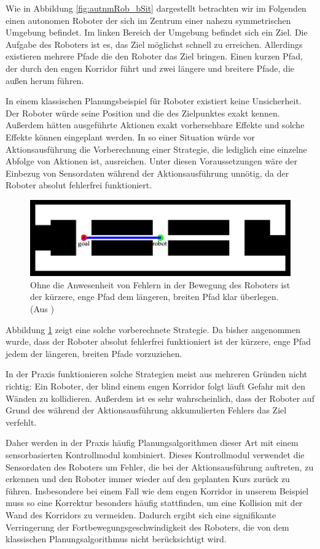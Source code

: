 \documentclass[a4paper]{IEEEtran}
\begin{document}
Wie in Abbildung \ref{fig:autnmRob_bSit} dargestellt betrachten wir im Folgenden einen autonomen Roboter der sich im Zentrum einer nahezu symmetrischen Umgebung befindet. Im linken Bereich der Umgebung befindet sich ein Ziel. Die Aufgabe des Roboters ist es, das Ziel möglichst schnell zu erreichen. Allerdings existieren mehrere Pfade die den Roboter das Ziel bringen. Einen kurzen Pfad, der durch den engen Korridor führt und zwei längere und breitere Pfade, die außen herum führen.

In einem klassischen Planungsbeispiel für Roboter existiert keine Unsicherheit. Der Roboter würde seine Position und die des Zielpunktes exakt kennen. Außerdem hätten ausgeführte Aktionen exakt vorhersehbare Effekte und solche Effekte können eingeplant werden. In so einer Situation würde vor Aktionsausführung die Vorberechnung einer Strategie, die lediglich eine einzelne Abfolge von Aktionen ist, ausreichen. Unter diesen Voraussetzungen wäre der Einbezug von Sensordaten während der Aktionsausführung unnötig, da der Roboter absolut fehlerfrei funktioniert.

\begin{figure}[ht]
	\centering
	\includegraphics[scale=0.72]{images/autnmRobot_directPath.png}
	\caption{Ohne die Anwesenheit von Fehlern in der Bewegung des Roboters ist der kürzere, enge Pfad dem längeren, breiten Pfad klar überlegen. (Aus \cite{thrun2005probabilistic})}
	\label{fig:autnmRob_dirPath}
\end{figure}

Abbildung \ref{fig:autnmRob_dirPath} zeigt eine solche vorberechnete Strategie. Da bisher angenommen wurde, dass der Roboter absolut fehlerfrei funktioniert ist der kürzere, enge Pfad jedem der längeren, breiten Pfade vorzuziehen.

In der Praxis funktionieren solche Strategien meist aus mehreren Gründen nicht richtig: Ein Roboter, der blind einem engen Korridor folgt läuft Gefahr mit den Wänden zu kollidieren. Außerdem ist es sehr wahrscheinlich, dass der Roboter auf Grund des während der Aktionsausführung akkumulierten Fehlers das Ziel verfehlt.

Daher werden in der Praxis häufig Planungsalgorithmen dieser Art mit einem sensorbasierten Kontrollmodul kombiniert. Dieses Kontrollmodul verwendet die Sensordaten des Roboters um Fehler, die bei der Aktionsausführung auftreten, zu erkennen und den Roboter immer wieder auf den geplanten Kurs zurück zu führen. Insbesondere bei einem Fall wie dem engen Korridor in unserem Beispiel muss so eine Korrektur besonders häufig stattfinden, um eine Kollision mit der Wand des Korridors zu vermeiden. Dadurch ergibt sich eine signifikante Verringerung der Fortbewegungsgeschwindigkeit des Roboters, die von dem klassischen Planungsalgorithmus nicht berücksichtigt wird. 
\end{document}
